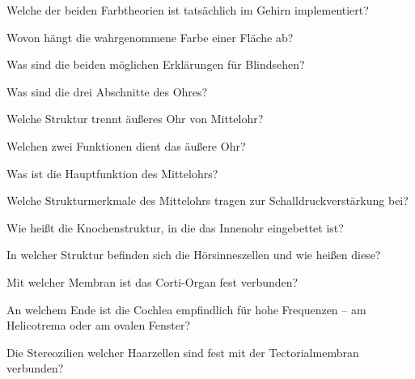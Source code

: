 \documentclass[10pt, a4paper]{exam}
\begin{document}
\begin{questions}
  \begin{solution}
  \end{solution}
  \question Welche der beiden Farbtheorien ist tatsächlich im Gehirn implementiert?
  \begin{solution}
  \end{solution}
  \question Wovon hängt die wahrgenommene Farbe einer Fläche ab?
  \begin{solution}
  \end{solution}
  \question Was sind die beiden möglichen Erklärungen für Blindsehen?
  \begin{solution}
  \end{solution}
  \question Was sind die drei Abschnitte des Ohres?
  \begin{solution}
  \end{solution}
  \question Welche Struktur trennt äußeres Ohr von Mittelohr?
  \begin{solution}
  \end{solution}
  \question Welchen zwei Funktionen dient das äußere Ohr?
  \begin{solution}
  \end{solution}
  \question Was ist die Hauptfunktion des Mittelohrs?
  \begin{solution}
  \end{solution}
  \question Welche Strukturmerkmale des Mittelohrs tragen zur Schalldruckverstärkung bei?
  \begin{solution}
  \end{solution}
  \question Wie heißt die Knochenstruktur, in die das Innenohr eingebettet ist?
  \begin{solution}
  \end{solution}
  \question In welcher Struktur befinden sich die Hörsinneszellen und wie heißen diese?
  \begin{solution}
  \end{solution}
  \question Mit welcher Membran ist das Corti-Organ fest verbunden?
  \begin{solution}
  \end{solution}
  \question An welchem Ende ist die Cochlea empfindlich für hohe Frequenzen – am Helicotrema oder am ovalen Fenster?
  \begin{solution}
  \end{solution}
  \question Die Stereozilien welcher Haarzellen sind fest mit der Tectorialmembran verbunden?
  \begin{solution}
  \end{solution}

\end{questions}
\end{document}
